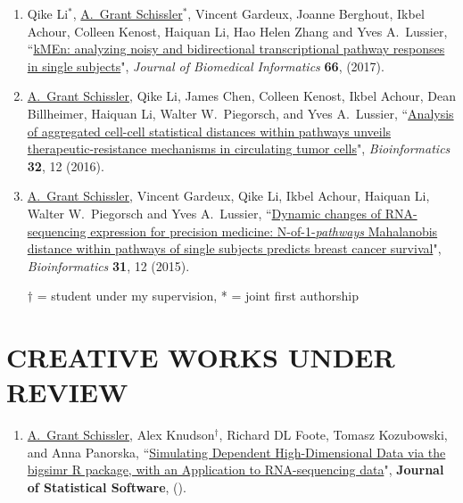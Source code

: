 \documentclass[paper=a4,fontsize=11pt]{scrartcl} %
\newcommand{\NewPart}[2]{\section*{\uppercase{#1} #2 }}
\newcommand{\PaperEntry}[7]{
		\noindent #1, ``\href{#7}{#2}", \textit{#3} \textbf{#4}, #5 (#6).}
\begin{document}
\begin{enumerate}
\item \PaperEntry{Qike Li$^{*}$, \underline{A.~Grant Schissler}$^{*}$, Vincent Gardeux, Joanne Berghout, Ikbel Achour, Colleen Kenost, Haiquan Li, Hao Helen Zhang and Yves A.~Lussier}{kMEn: analyzing noisy and bidirectional transcriptional pathway responses in single subjects}{Journal of Biomedical Informatics}{66}{}{2017}{http://www.sciencedirect.com/science/article/pii/S1532046416301836}

\item \PaperEntry{\underline{A.~Grant Schissler}, Qike Li, James Chen, Colleen Kenost, Ikbel Achour, Dean Billheimer, Haiquan Li, Walter W.~Piegorsch, and Yves A.~Lussier}{Analysis of aggregated cell-cell statistical distances within pathways unveils therapeutic-resistance mechanisms in circulating tumor cells}{Bioinformatics}{32}{12}{2016}{http://bioinformatics.oxfordjournals.org/content/32/12/i80.full}

\item \PaperEntry{\underline{A.~Grant Schissler}, Vincent Gardeux, Qike Li, Ikbel Achour, Haiquan Li, Walter W.~Piegorsch and Yves A.~Lussier}{Dynamic changes of RNA-sequencing expression for precision medicine: N-of-1-\textit{pathways} Mahalanobis distance within pathways of single subjects predicts breast cancer survival}{Bioinformatics}{31}{12}{2015}{http://bioinformatics.oxfordjournals.org/content/31/12/i293.full}

  $\dagger$ = student under my supervision, * = joint first authorship
\end{enumerate}


\NewPart{Creative works under review}{}
\vspace{-7pt}
\begin{enumerate}

\item \PaperEntry{\underline{A.~Grant Schissler}, Alex Knudson$^{\dagger}$, Richard DL Foote, Tomasz Kozubowski, and Anna Panorska}{Simulating Dependent High-Dimensional Data via the bigsimr R package, with an Application to RNA-sequencing data}{}{Journal of Statistical Software}{}{}{}
  
\end{enumerate}
\end{document}
